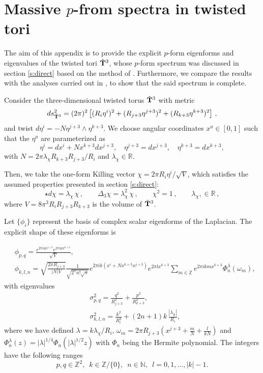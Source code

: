 \documentclass[11pt]{article}
\def\be{\begin{equation}}
\def\ee{\end{equation}}
\def\bea{\begin{eqnarray}}
\def\eea{\end{eqnarray}}
\newcommand{\IR}{\mathbb{R}}
\begin{document}
\section{Massive $p$-from spectra in twisted tori}
\label{ap:spectra}

The aim of this appendix is to provide the explicit $p$-form eigenforms and eigenvalues of the twisted tori $\tilde{\bf T}^3$, whose $p$-form  spectrum was discussed in section \ref{s:direct} based on the method of  \cite{Ben_Achour_2016}. Furthermore, we compare the results with the analyses carried out in \cite{Andriot:2018tmb}, to show that the said spectrum is complete.

Consider the three-dimensional twisted torus  $\tilde{\bf T}^3$ with metric 
\be
ds^2_{\tilde{\bf T}^3} = (2\pi)^2 \left[(R_i\eta^i)^2 + (R_{j+3}\eta^{j+3})^2 + (R_{k+3}\eta^{k+3})^2 \right] \,,
\ee
and twist $d\eta^{i} = - N \eta^{j+3}\wedge \eta^{k+3}$. We choose angular coordinates $x^a\in[0,1]$ such that the $\eta^a$ are parameterized as 
\be
\eta^{i} = dx^{i} + N x^{k+3} dx^{j+3},\hspace{1em}\eta^{j+3} = dx^{j+3},\hspace{1em}\eta^{{k+3}}=dx^{{k+3}},
\ee
with $N=2\pi\lambda_{\chi} R_{k+3} R_{j+3}/R_{i}$ and  $\lambda_{\chi}\in \mathbb{R}$.

Then, we take the one-form Killing vector $\chi=2\pi R_{i} \eta^{i}/\sqrt{V}$, which satisfies the assumed properties presented in section \ref{s:direct}:
\begin{equation}
	\star d \chi = \lambda_\chi \,\chi \,, \qquad \Delta_3 \chi = \lambda_\chi^2\, \chi \,, \qquad \chi^2 = 1  \,, \qquad  \lambda_\chi, \in \IR \, ,
\end{equation}
where $V=8\pi^3R_iR_{j+3}R_{k+3}$ is the volume of $\tilde{\bf T}^3$.

Let $\{\phi_i\}$ represent the basis of complex scalar eigenforms of the Laplacian. The explicit shape of these eigenforms is \cite{Andriot:2018tmb}

\bea
&\phi_{p,q} = \frac{e^{2\pi i q x^{j+3}}e^{2\pi i p x^{k+3}}}{\sqrt{V}},\label{eq: phipq}\\
& \phi_{k,l,n} = \sqrt{\frac{2\pi R_{j+3}}{|N|V}}\frac{1}{\sqrt{2^n n!\sqrt{\pi}}} e^{2\pi i k(x^{i} + N x^{k+3} x^{j+3})}e^{2\pi l x^{k+3}} \sum_{m\in\mathbb{Z}}e^{2\pi i k mx^{k+3}}\Phi_n^\lambda(\omega_m),\label{eq: phikln}
\eea
with eigenvalues
\bea
& \sigma^2_{p,q}= \frac{q^2}{R^2_{j+3}}+\frac{p^2}{R^2_{k+3}}  ,\\
&\sigma^2_{k,l,n} = \frac{k^2}{R_{i}^2} + (2 n +1)k \,\frac{|\lambda_{\chi}|}{R_{i}},
\eea
where we have defined $\lambda=k\lambda_\chi /R_{i}$, $\omega_m= 2\pi R_{j+3}(x^{j+3} + \frac{m}{N}+\frac{l}{kN})$ and $\Phi_{n}^{\lambda}(z)=|\lambda|^{1/4}\Phi_n(|\lambda|^{1/2}z)$ with $\Phi_n$ being the Hermite polynomial. The integers have the following ranges
\be
p,q \in \mathbb{Z}^2,\,\,\,k\in \mathbb{Z}/\{0\},\,\,\, n\in \mathbb{N},\,\, \,l=0,1,\dots,|k|-1.
\ee
\end{document}
